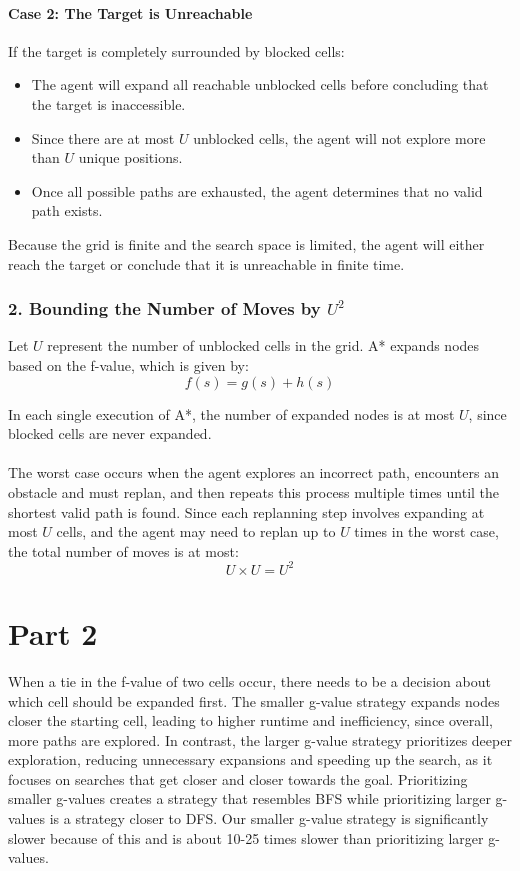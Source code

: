 \documentclass{article}
\begin{document}
\paragraph{Case 2: The Target is Unreachable}
If the target is completely surrounded by blocked cells:
\begin{itemize}
    \item The agent will expand all reachable unblocked cells before concluding that the target is inaccessible.
    \item Since there are at most $U$ unblocked cells, the agent will not explore more than $U$ unique positions.
    \item Once all possible paths are exhausted, the agent determines that no valid path exists.
\end{itemize}

Because the grid is finite and the search space is limited, the agent will either reach the target or conclude that it is unreachable in finite time.

\subsubsection*{2. Bounding the Number of Moves by $U^2$}

Let $U$ represent the number of unblocked cells in the grid. A* expands nodes based on the f-value, which is given by:
\[f(s) = g(s) + h(s)\]


In each single execution of A*, the number of expanded nodes is at most $U$, since blocked cells are never expanded.

\paragraph{}
The worst case occurs when the agent explores an incorrect path, encounters an obstacle and must replan, and then repeats this process multiple times until the shortest valid path is found. Since each replanning step involves expanding at most $U$ cells, and the agent may need to replan up to $U$ times in the worst case, the total number of moves is at most:
\[U \times U = U^2\]

\section{Part 2}
When a tie in the f-value of two cells occur, there needs to be a decision about which cell should be expanded first. The smaller g-value strategy expands nodes closer the starting cell, leading to higher runtime and inefficiency, since overall, more paths are explored. In contrast, the larger g-value strategy prioritizes deeper exploration, reducing unnecessary expansions and speeding up the search, as it focuses on searches that get closer and closer towards the goal. Prioritizing smaller g-values creates a strategy that resembles BFS while prioritizing larger g-values is a strategy closer to DFS. Our smaller g-value strategy is significantly slower because of this and is about 10-25 times slower than prioritizing larger g-values.
\end{document}
